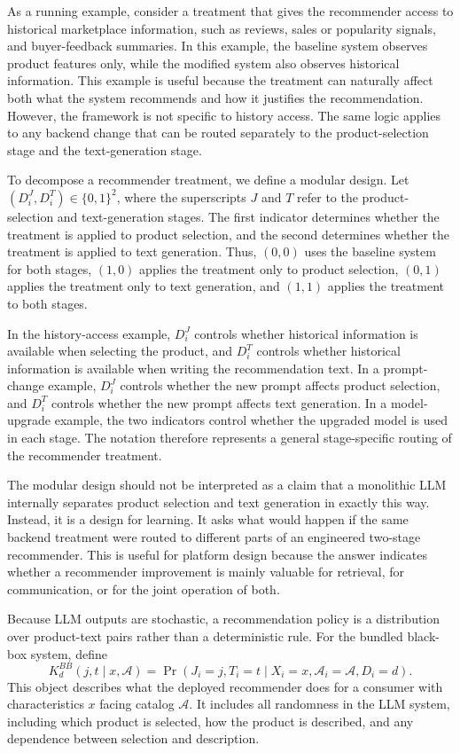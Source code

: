 \documentclass[11pt]{article}
\newcommand{\J}{J}
\newcommand{\catalog}{\mathcal{A}}
\begin{document}
As a running example, consider a treatment that gives the recommender access to historical marketplace information, such as reviews, sales or popularity signals, and buyer-feedback summaries. In this example, the baseline system observes product features only, while the modified system also observes historical information. This example is useful because the treatment can naturally affect both what the system recommends and how it justifies the recommendation. However, the framework is not specific to history access. The same logic applies to any backend change that can be routed separately to the product-selection stage and the text-generation stage.

To decompose a recommender treatment, we define a modular design. Let $(D_i^J,D_i^T) \in \{0,1\}^2$, where the superscripts $J$ and $T$ refer to the product-selection and text-generation stages. The first indicator determines whether the treatment is applied to product selection, and the second determines whether the treatment is applied to text generation. Thus, $(0,0)$ uses the baseline system for both stages, $(1,0)$ applies the treatment only to product selection, $(0,1)$ applies the treatment only to text generation, and $(1,1)$ applies the treatment to both stages.

In the history-access example, $D_i^J$ controls whether historical information is available when selecting the product, and $D_i^T$ controls whether historical information is available when writing the recommendation text. In a prompt-change example, $D_i^J$ controls whether the new prompt affects product selection, and $D_i^T$ controls whether the new prompt affects text generation. In a model-upgrade example, the two indicators control whether the upgraded model is used in each stage. The notation therefore represents a general stage-specific routing of the recommender treatment.

The modular design should not be interpreted as a claim that a monolithic LLM internally separates product selection and text generation in exactly this way. Instead, it is a design for learning. It asks what would happen if the same backend treatment were routed to different parts of an engineered two-stage recommender. This is useful for platform design because the answer indicates whether a recommender improvement is mainly valuable for retrieval, for communication, or for the joint operation of both.

Because LLM outputs are stochastic, a recommendation policy is a distribution over product-text pairs rather than a deterministic rule. For the bundled black-box system, define
\begin{equation}
K^{BB}_d(j,t \mid x,\catalog) = \Pr(\J_i = j, T_i = t \mid X_i = x, \catalog_i = \catalog, D_i = d).
\label{eq:kernel-blackbox}
\end{equation}
This object describes what the deployed recommender does for a consumer with characteristics $x$ facing catalog $\catalog$. It includes all randomness in the LLM system, including which product is selected, how the product is described, and any dependence between selection and description.
\end{document}
